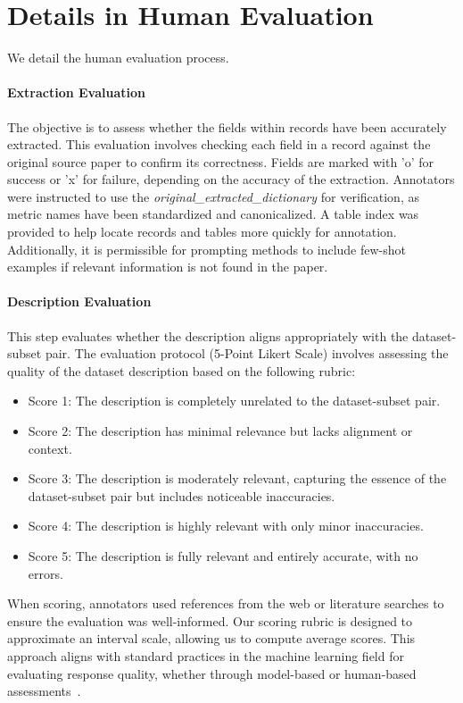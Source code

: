 \section{Details in Human Evaluation}
\label{appendix:human_evaluation}

We detail the human evaluation process.

\paragraph{Extraction Evaluation}
The objective is to assess whether the fields within records have been accurately extracted. 
This evaluation involves checking each field in a record against the original source paper to confirm its correctness. 
Fields are marked with 'o' for success or 'x' for failure, depending on the accuracy of the extraction. 
Annotators were instructed to use the \textit{original\_extracted\_dictionary} for verification, as metric names have been standardized and canonicalized. 
A table index was provided to help locate records and tables more quickly for annotation. 
Additionally, it is permissible for prompting methods to include few-shot examples if relevant information is not found in the paper.  


\paragraph{Description Evaluation}
This step evaluates whether the description aligns appropriately with the dataset-subset pair. 
The evaluation protocol (5-Point Likert Scale) involves assessing the quality of the dataset description based on the following rubric:  

\begin{itemize}
\item Score 1: The description is completely unrelated to the dataset-subset pair.  
\item Score 2: The description has minimal relevance but lacks alignment or context. 
\item Score 3: The description is moderately relevant, capturing the essence of the dataset-subset pair but includes noticeable inaccuracies.  
\item Score 4: The description is highly relevant with only minor inaccuracies.  
\item Score 5: The description is fully relevant and entirely accurate, with no errors.  
\end{itemize}

When scoring, annotators used references from the web or literature searches to ensure the evaluation was well-informed.
Our scoring rubric is designed to approximate an interval scale, allowing us to compute average scores. 
This approach aligns with standard practices in the machine learning field for evaluating response quality, whether through model-based or human-based assessments~\citep{liu2023g, kim2023prometheus}.